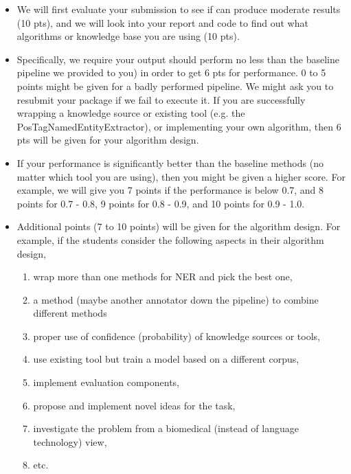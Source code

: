 \begin{itemize}

\item We will first evaluate your submission to see if can produce moderate
results (10 pts), and we will look into your report and code to find out what
algorithms or knowledge base you are using (10 pts).

\item Specifically, we require your output should perform no less than the
baseline pipeline we provided to you) in order to get 6 pts for performance. 0
to 5 points might be given for a badly performed pipeline. We might ask you to
resubmit your package if we fail to execute it. If you are successfully
wrapping a knowledge source or existing tool (e.g. the
PosTagNamedEntityExtractor), or implementing your own algorithm, then 6 pts will
be given for your algorithm design.

\item If your performance is significantly better than the baseline methods (no
matter which tool you are using), then you might be given a higher score.
For example, we will give you 7 points if the performance is below 0.7, and 8
points for 0.7 - 0.8, 9 points for 0.8 - 0.9, and 10 points for 0.9 - 1.0.

\item Additional points (7 to 10 points) will be given for the algorithm design.
For example, if the students consider the following aspects in their algorithm
design,

\begin{enumerate}
\item wrap more than one methods for NER and pick the best one,
\item a method (maybe another annotator down the pipeline) to combine different methods
\item proper use of confidence (probability) of knowledge sources or tools,
\item use existing tool but train a model based on a different corpus,
\item implement evaluation components,
\item propose and implement novel ideas for the task,
\item investigate the problem from a biomedical (instead of language technology) view,
\item etc.
\end{enumerate}


\end{itemize}
